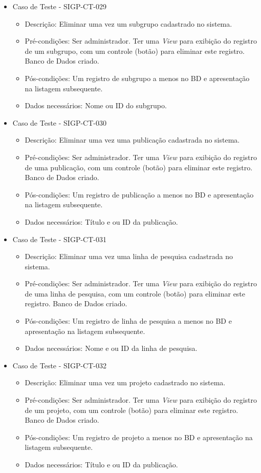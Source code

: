 \documentclass[11pt, a4paper]{book}
\begin{document}
\begin{itemize}
	\item Caso de Teste - SIGP-CT-029
	\begin{itemize}
	\item Descrição: Eliminar uma vez um subgrupo cadastrado no sistema.
	\item Pré-condições: Ser administrador. Ter uma \emph{View} para exibição do registro de um subgrupo, com um controle (botão) para eliminar este registro. Banco de Dados criado.
	\item Pós-condições: Um registro de subgrupo a menos no BD e apresentação na listagem subsequente.
	\item Dados necessários: Nome ou ID do subgrupo.
	\end{itemize}

\newpage

	\item Caso de Teste - SIGP-CT-030
	\begin{itemize}
	\item Descrição: Eliminar uma vez uma publicação cadastrada no sistema.
	\item Pré-condições: Ser administrador. Ter uma \emph{View} para exibição do registro de uma publicação, com um controle (botão) para eliminar este registro. Banco de Dados criado.
	\item Pós-condições: Um registro de publicação a menos no BD e apresentação na listagem subsequente.
	\item Dados necessários: Título e ou ID da publicação.
	\end{itemize}


	\item Caso de Teste - SIGP-CT-031
	\begin{itemize}
	\item Descrição: Eliminar uma vez uma linha de pesquisa cadastrada no sistema.
	\item Pré-condições: Ser administrador. Ter uma \emph{View} para exibição do registro de uma linha de pesquisa, com um controle (botão) para eliminar este registro. Banco de Dados criado.
	\item Pós-condições: Um registro de linha de pesquisa a menos no BD e apresentação na listagem subsequente.
	\item Dados necessários: Nome e ou ID da linha de pesquisa.
	\end{itemize}

	\item Caso de Teste - SIGP-CT-032
	\begin{itemize}
	\item Descrição: Eliminar uma vez um projeto cadastrado no sistema.
	\item Pré-condições: Ser administrador. Ter uma \emph{View} para exibição do registro de um projeto, com um controle (botão) para eliminar este registro. Banco de Dados criado.
	\item Pós-condições: Um registro de projeto a menos no BD e apresentação na listagem subsequente.
	\item Dados necessários: Título e ou ID da publicação.
	\end{itemize}


\end{itemize}
\end{document}
